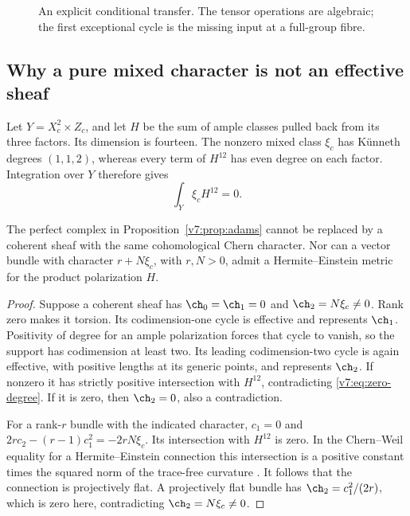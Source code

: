 \begin{figure}[htbp]
\centering
{}
\caption{An explicit conditional transfer. The tensor operations are
algebraic; the first exceptional cycle is the missing input at a
full-group fibre.}\label{v7:fig:transfer}
\end{figure}

\subsection{Why a pure mixed character is not an effective sheaf}

Let $Y=X_c^2\times Z_c$, and let $H$ be the sum of ample classes
pulled back from its three factors. Its dimension is fourteen.
The nonzero mixed class $\xi_c$ has K\"unneth degrees $(1,1,2)$,
whereas every term of $H^{12}$ has even degree on each factor.
Integration over $Y$ therefore gives
\begin{equation}\label{v7:eq:zero-degree}
 \int_Y \xi_c H^{12}=0.
\end{equation}

\begin{proposition}\label{v7:prop:no-effective-pure}
The perfect complex in Proposition~\ref{v7:prop:adams} cannot be
replaced by a coherent sheaf with the same cohomological Chern
character. Nor can a vector bundle with character $r+N\xi_c$, with
$r,N>0$, admit a Hermite--Einstein metric for the product polarization
$H$.
\end{proposition}
\begin{proof}
Suppose a coherent sheaf has $\ch_0=\ch_1=0$ and
$\ch_2=N\xi_c\ne0$. Rank zero makes it torsion. Its codimension-one
cycle is effective and represents $\ch_1$. Positivity of degree for
an ample polarization forces that cycle to vanish, so the support
has codimension at least two. Its leading codimension-two cycle is
again effective, with positive lengths at its generic points, and
represents $\ch_2$. If nonzero it has strictly positive intersection
with $H^{12}$, contradicting \eqref{v7:eq:zero-degree}. If it is zero,
then $\ch_2=0$, also a contradiction.

For a rank-$r$ bundle with the indicated character, $c_1=0$ and
$2r c_2-(r-1)c_1^2=-2rN\xi_c$. Its intersection with $H^{12}$ is
zero. In the Chern--Weil equality for a Hermite--Einstein connection
this intersection is a positive constant times the squared norm
of the trace-free curvature \cite{Lub82}. It follows that the
connection is projectively flat. A projectively flat bundle has
$\ch_2=c_1^2/(2r)$, which is zero here, contradicting
$\ch_2=N\xi_c\ne0$.
\end{proof}

